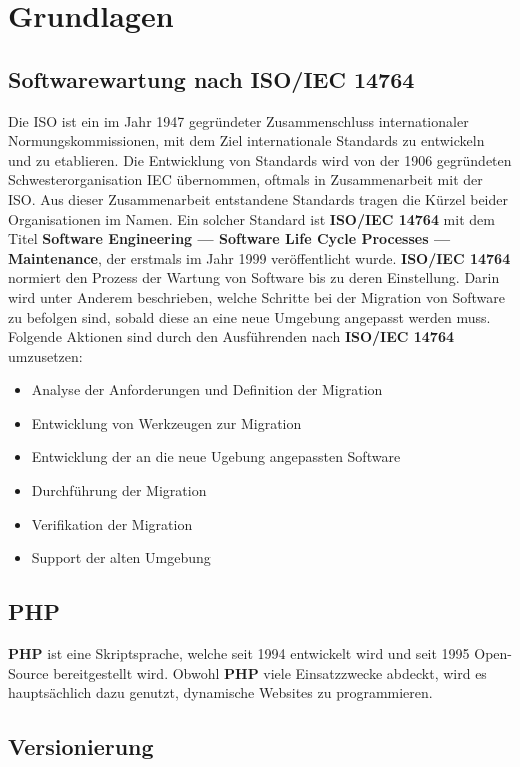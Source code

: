 \chapter{Grundlagen}\label{ch:grundlagen}

\section{Softwarewartung nach ISO/IEC 14764}
Die \ac{ISO} ist ein im Jahr 1947 gegründeter Zusammenschluss internationaler Normungskommissionen, mit dem Ziel internationale Standards zu entwickeln und zu etablieren.\cite{international_organization_for_standardization:_about_nodate}
Die Entwicklung von Standards wird von der 1906 gegründeten Schwesterorganisation \ac{IEC} übernommen, oftmals in Zusammenarbeit mit der \ac{ISO}.\cite{international_electrotechnical_commission_iec_nodate}
Aus dieser Zusammenarbeit entstandene Standards tragen die Kürzel beider Organisationen im Namen. Ein solcher Standard ist \textbf{ISO/IEC 14764} mit dem Titel
\textbf{Software Engineering — Software Life Cycle Processes — Maintenance}, der erstmals im Jahr 1999 veröffentlicht wurde.
\textbf{ISO/IEC 14764} normiert den Prozess der Wartung von Software bis zu deren Einstellung.
Darin wird unter Anderem beschrieben, welche Schritte bei der Migration von Software zu befolgen sind, sobald diese an eine neue Umgebung angepasst werden muss.
Folgende Aktionen sind durch den Ausführenden nach \textbf{ISO/IEC 14764} umzusetzen:
\begin{itemize}
    \item Analyse der Anforderungen und Definition der Migration
    \item Entwicklung von Werkzeugen zur Migration
    \item Entwicklung der an die neue Ugebung angepassten Software
    \item Durchführung der Migration
    \item Verifikation der Migration
    \item Support der alten Umgebung
\end{itemize}

\section{PHP}
\textbf{\ac{PHP}} ist eine Skriptsprache, welche seit 1994 entwickelt wird und seit 1995 Open-Source bereitgestellt wird.
Obwohl \textbf{PHP} viele Einsatzzwecke abdeckt, wird es hauptsächlich dazu genutzt, dynamische Websites zu programmieren.

\section{Versionierung}


